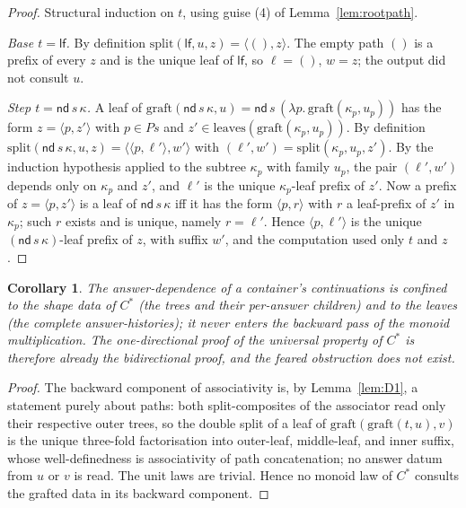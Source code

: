\documentclass[11pt,reqno]{amsart}
\theoremstyle{plain}
\newtheorem{corollary}[theorem]{Corollary}
\theoremstyle{definition}
\newcommand{\leaves}{\mathrm{leaves}}
\newcommand{\graft}{\mathrm{graft}}
\newcommand{\spl}{\mathrm{split}}
\newcommand{\lf}{\mathsf{lf}}
\newcommand{\nd}{\mathsf{nd}}
\begin{document}
\begin{proof}
Structural induction on $t$, using guise (4) of Lemma~\ref{lem:rootpath}.

\emph{Base $t = \lf$.} By definition $\spl(\lf,u,z) = \langle(),z\rangle$. The empty path $()$ is a prefix
of every $z$ and is the unique leaf of $\lf$, so $\ell = ()$, $w = z$; the output did not consult $u$.

\emph{Step $t = \nd\, s\, \kappa$.} A leaf of $\graft(\nd\, s\, \kappa, u) = \nd\, s\,(\lambda p.\,
\graft(\kappa_p, u_p))$ has the form $z = \langle p, z'\rangle$ with $p \in P s$ and
$z' \in \leaves(\graft(\kappa_p, u_p))$. By definition $\spl(\nd\, s\, \kappa, u, z) =
\langle\langle p, \ell'\rangle, w'\rangle$ with $(\ell', w') = \spl(\kappa_p, u_p, z')$. By the induction
hypothesis applied to the subtree $\kappa_p$ with family $u_p$, the pair $(\ell', w')$ depends only on
$\kappa_p$ and $z'$, and $\ell'$ is the unique $\kappa_p$-leaf prefix of $z'$. Now a prefix of
$z = \langle p, z'\rangle$ is a leaf of $\nd\, s\, \kappa$ iff it has the form $\langle p, r\rangle$ with
$r$ a leaf-prefix of $z'$ in $\kappa_p$; such $r$ exists and is unique, namely $r = \ell'$. Hence
$\langle p, \ell'\rangle$ is the unique $(\nd\, s\, \kappa)$-leaf prefix of $z$, with suffix $w'$, and the
computation used only $t$ and $z$.
\end{proof}

\begin{corollary}\label{cor:no-obstruction}
The answer-dependence of a container's continuations is confined to the shape data of $C^{*}$ (the trees
and their per-answer children) and to the leaves (the complete answer-histories); it never enters the
backward pass of the monoid multiplication. The one-directional proof of the universal property of
$C^{*}$ is therefore already the bidirectional proof, and the feared obstruction does not exist.
\end{corollary}

\begin{proof}
The backward component of associativity is, by Lemma~\ref{lem:D1}, a statement purely about paths: both
split-composites of the associator read only their respective outer trees, so the double split of a leaf
of $\graft(\graft(t,u),v)$ is the unique three-fold factorisation into outer-leaf, middle-leaf, and inner
suffix, whose well-definedness is associativity of path concatenation; no answer datum from $u$ or $v$ is
read. The unit laws are trivial. Hence no monoid law of $C^{*}$ consults the grafted data in its backward
component.
\end{proof}
\end{document}
